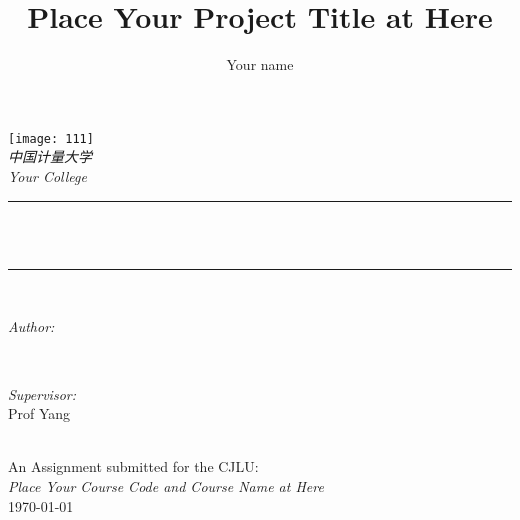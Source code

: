 \documentclass[12pt]{article}
\title{Place Your Project Title at Here}
\author{\textup{Your name}}
\begin{document}
	
	\begin{titlepage}
		\newcommand{\HRule}{\rule{\linewidth}{0.5mm}}
		\texttt{[image: 111]}
		\centering
		\quad\\[1.5cm]
		\textsl{\Large 中国计量大学 }\\[0.7cm] 
		\textsl{\large Your College}\\[0.7cm] 
		\makeatletter
		\HRule \\[0.4cm]
		{ \huge \bfseries \@title}\\[0.4cm] 
		\HRule \\[1.5cm]
		\begin{minipage}{0.4\textwidth}
			\begin{flushleft} \large
				\emph{Author:}\\
				\@author 
			\end{flushleft}
		\end{minipage}
		~
		\begin{minipage}{0.4\textwidth}
			\begin{flushright} \large
				\emph{Supervisor:} \\
				\textup{Prof Yang}
			\end{flushright}
		\end{minipage}\\[3cm]
		\makeatother
		{\large An Assignment submitted for the CJLU:}\\[0.5cm]
		{\large \emph{Place Your Course Code and Course Name at Here}}\\[0.5cm]
		{\large \today}\\[2cm] 
		\vfill 
	\end{titlepage}
	
\end{document}
